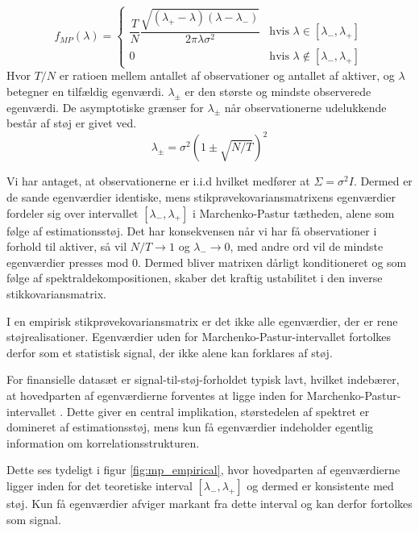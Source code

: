 \documentclass[../main.tex]{subfiles}
\begin{document}
\begin{equation}
    f_{MP}(\lambda) =
    \begin{cases}
        \dfrac{T}{N}\dfrac{\sqrt{(\lambda_{+}-\lambda)(\lambda-\lambda_{-})}}{2\pi\lambda\sigma^{2}} & \text{hvis } \lambda \in [\lambda_{-},\lambda_{+}] \\
        0 & \text{hvis } \lambda \notin [\lambda_{-},\lambda_{+}]
    \end{cases}
    \label{eq:mp_density}
\end{equation}
Hvor $T/N$ er ratioen mellem antallet af observationer og antallet af aktiver, og $\lambda$ betegner en tilfældig egenværdi. $\lambda_{\pm}$ er den største og mindste observerede egenværdi. De asymptotiske grænser for $\lambda_{\pm}$ når observationerne udelukkende består af støj er givet ved.
\begin{equation}
    \lambda_{\pm} = \sigma^{2} \left( 1 \pm \sqrt{N/T} \right)^{2}
    \label{eq:mp_bounds}
\end{equation}


Vi har antaget, at observationerne er i.i.d hvilket medfører at $\Sigma=\sigma^2 I$. Dermed er de sande egenværdier identiske, mens stikprøvekovariansmatrixens egenværdier fordeler sig over intervallet $[\lambda_-,\lambda_+]$ i Marchenko-Pastur tætheden, alene som følge af estimationsstøj.
Det har konsekvensen når vi har få observationer i forhold til aktiver, så vil $N/T\to1$ og $\lambda_{-}\to0$, med andre ord vil de mindste egenværdier presses mod 0. Dermed bliver matrixen dårligt konditioneret og som følge af  spektraldekompositionen, skaber det kraftig ustabilitet i den inverse stikkovariansmatrix. 


I en empirisk stikprøvekovariansmatrix er det ikke alle egenværdier, der er rene støjrealisationer. Egenværdier uden for Marchenko-Pastur-intervallet fortolkes derfor som et statistisk signal, der ikke alene kan forklares af støj. 

For finansielle datasæt er signal-til-støj-forholdet typisk lavt, hvilket indebærer, at hovedparten af egenværdierne forventes at ligge inden for Marchenko-Pastur-intervallet \cite{lopez_de_prado_machine_2020}. Dette giver en central implikation, størstedelen af spektret er domineret af estimationsstøj, mens kun få egenværdier indeholder egentlig information om korrelationsstrukturen.

Dette ses tydeligt i figur \ref{fig:mp_empirical}, hvor hovedparten af egenværdierne ligger inden for det teoretiske interval $[\lambda_-, \lambda_+]$ og dermed er konsistente med støj. Kun få egenværdier afviger markant fra dette interval og kan derfor fortolkes som signal.
\end{document}

